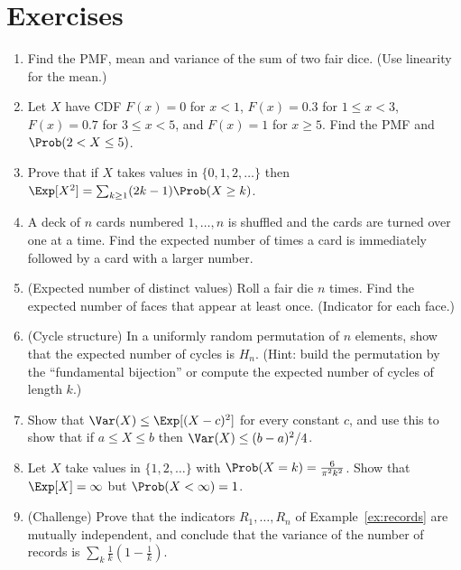 \section*{Exercises}

\begin{enumerate}
\item Find the PMF, mean and variance of the sum of two fair dice. (Use
linearity for the mean.)
\item Let $X$ have CDF $F(x)=0$ for $x<1$, $F(x)=0.3$ for $1\le x<3$,
$F(x)=0.7$ for $3\le x<5$, and $F(x)=1$ for $x\ge5$. Find the PMF and
$\Prob(2<X\le5)$.
\item Prove that if $X$ takes values in $\{0,1,2,\dots\}$ then
$\Exp[X^2]=\sum_{k\ge1}(2k-1)\Prob(X\ge k)$.
\item A deck of $n$ cards numbered $1,\dots,n$ is shuffled and the cards are
turned over one at a time. Find the expected number of times a card is
immediately followed by a card with a larger number.
\item (Expected number of distinct values) Roll a fair die $n$ times. Find the
expected number of faces that appear at least once. (Indicator for each face.)
\item (Cycle structure) In a uniformly random permutation of $n$ elements, show
that the expected number of cycles is $H_n$. (Hint: build the permutation by
the ``fundamental bijection'' or compute the expected number of cycles of
length $k$.)
\item Show that $\Var(X)\le\Exp[(X-c)^2]$ for every constant $c$, and use this
to show that if $a\le X\le b$ then $\Var(X)\le(b-a)^2/4$.
\item Let $X$ take values in $\{1,2,\dots\}$ with $\Prob(X=k)=\frac{6}{\pi^2k^2}$.
Show that $\Exp[X]=\infty$ but $\Prob(X<\infty)=1$.
\item (Challenge) Prove that the indicators $R_1,\dots,R_n$ of
Example~\ref{ex:records} are mutually independent, and conclude that the
variance of the number of records is $\sum_k\frac1k(1-\frac1k)$.
\end{enumerate}
